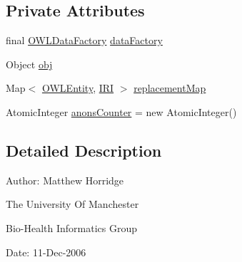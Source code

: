 \subsection*{Private Attributes}
\begin{DoxyCompactItemize}
\item 
final \hyperlink{interfaceorg_1_1semanticweb_1_1owlapi_1_1model_1_1_o_w_l_data_factory}{O\-W\-L\-Data\-Factory} \hyperlink{classorg_1_1semanticweb_1_1owlapi_1_1util_1_1_o_w_l_object_duplicator_a0b21efd4bc36ed4955d421aec99f4303}{data\-Factory}
\item 
Object \hyperlink{classorg_1_1semanticweb_1_1owlapi_1_1util_1_1_o_w_l_object_duplicator_aacc5a3aff516de182bd799f63dbcdec4}{obj}
\item 
Map$<$ \hyperlink{interfaceorg_1_1semanticweb_1_1owlapi_1_1model_1_1_o_w_l_entity}{O\-W\-L\-Entity}, \hyperlink{classorg_1_1semanticweb_1_1owlapi_1_1model_1_1_i_r_i}{I\-R\-I} $>$ \hyperlink{classorg_1_1semanticweb_1_1owlapi_1_1util_1_1_o_w_l_object_duplicator_aaa2edefd8202c687e1e1427a57dfa908}{replacement\-Map}
\item 
Atomic\-Integer \hyperlink{classorg_1_1semanticweb_1_1owlapi_1_1util_1_1_o_w_l_object_duplicator_a7cda42f658db5247d39860579d5649c3}{anons\-Counter} = new Atomic\-Integer()
\end{DoxyCompactItemize}


\subsection{Detailed Description}
Author\-: Matthew Horridge\par
 The University Of Manchester\par
 Bio-\/\-Health Informatics Group\par
 Date\-: 11-\/\-Dec-\/2006\par
\par
 

